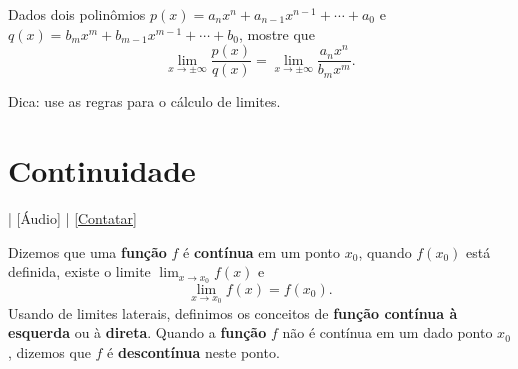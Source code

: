 \begin{exer}\label{exer:lim_xinf_racio}
  Dados dois polinômios $p(x) = a_nx^n+a_{n-1}x^{n-1}+\cdots + a_0$ e $q(x) = b_mx^m+b_{m-1}x^{m-1}+\cdots + b_0$, mostre que
  \begin{equation}
    \lim_{x\to \pm\infty} \frac{p(x)}{q(x)} = \lim_{x\to\pm\infty}\frac{a_nx^n}{b_mx^m}.
  \end{equation}
\end{exer}
\begin{resp}
  Dica: use as regras para o cálculo de limites.
\end{resp}


\section{Continuidade}\label{cap_lim_sec_cont}

\begin{flushright}
  [Vídeo] | [Áudio] | \href{https://phkonzen.github.io/notas/contato.html}{[Contatar]}
\end{flushright}

Dizemos que uma {\bf função} $f$ é {\bf contínua} em um ponto $x_0$, quando $f(x_0)$ está definida, existe o limite $\displaystyle \lim_{x\to x_0} f(x)$ e
\begin{equation}
  \lim_{x\to x_0} f(x) = f(x_0).
\end{equation}
Usando de limites laterais, definimos os conceitos de {\bf função contínua à esquerda} ou à {\bf direta}. Quando a {\bf função} $f$ não é contínua em um dado ponto $x_0$, dizemos que $f$ é {\bf descontínua} neste ponto.

